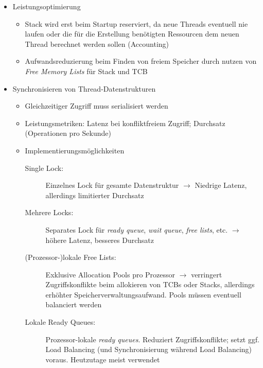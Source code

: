 \begin{itemize}
\begin{itemize}
\begin{itemize}
			\item Leistungsoptimierung
			\begin{itemize}
				\item Stack wird erst beim Startup reserviert, da neue Threads eventuell nie laufen oder die für die Erstellung benötigten Ressourcen dem neuen Thread berechnet werden sollen (Accounting)
				\item Aufwandsreduzierung beim Finden von freiem Speicher durch nutzen von \textit{Free Memory Lists} für Stack und TCB
			\end{itemize}
			\item Synchronisieren von Thread-Datenstrukturen
			\begin{itemize}
				\item Gleichzeitiger Zugriff muss serialisiert werden
				\item Leistungsmetriken: Latenz bei konfliktfreiem Zugriff; Durchsatz (Operationen pro Sekunde)
				\item Implementierungsmöglichkeiten
				\begin{description}
					\item[Single Lock:] Einzelnes Lock für gesamte Datenstruktur \(\rightarrow\) Niedrige Latenz, allerdings limitierter Durchsatz
					\item[Mehrere Locks:] Separates Lock für \textit{ready queue}, \textit{wait queue}, \textit{free lists}, etc. \(\rightarrow\) höhere Latenz, besseres Durchsatz
					\item[(Prozessor-)lokale Free Lists:] Exklusive Allocation Pools pro Prozessor \(\rightarrow\) verringert Zugriffskonflikte beim allokieren von TCBs oder Stacks, allerdings erhöhter Speicherverwaltungsaufwand. Pools müssen eventuell balanciert werden
					\item[Lokale Ready Queues:] Prozessor-lokale \textit{ready queues}. Reduziert Zugriffskonflikte; setzt ggf. Load Balancing (und Synchronisierung während Load Balancing) voraus. Heutzutage meist verwendet
				\end{description}
			\end{itemize}
		\end{itemize}
	\end{itemize}
\end{itemize}


